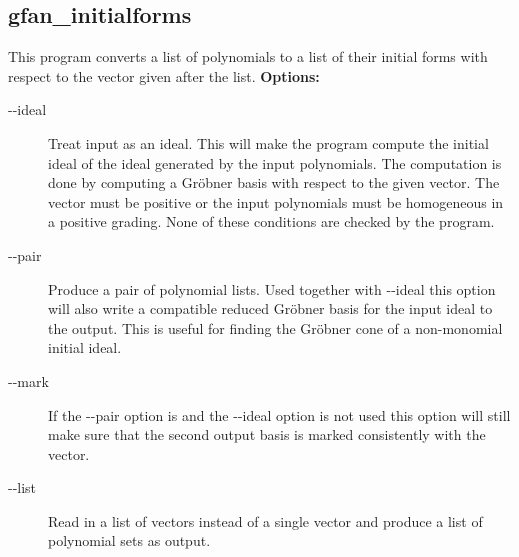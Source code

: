 {{{{{{{{{{{{{{{\subsection{gfan\_initialforms}\label{applist:_initialforms}
This program converts a list of polynomials to a list of their initial forms with respect to the vector given after the list.
\newline
{\bf Options:}
\begin{description}
\item[-\hspace{0.013cm}-ideal]Treat input as an ideal. This will make the program compute the initial ideal of the ideal generated by the input polynomials. The computation is done by computing a Gr\"obner basis with respect to the given vector. The vector must be positive or the input polynomials must be homogeneous in a positive grading. None of these conditions are checked by the program.
\item[-\hspace{0.013cm}-pair]Produce a pair of polynomial lists. Used together with -\hspace{0.013cm}-ideal this option will also write a compatible reduced Gr\"obner basis for the input ideal to the output. This is useful for finding the Gr\"obner cone of a non-monomial initial ideal.
\item[-\hspace{0.013cm}-mark]If the -\hspace{0.013cm}-pair option is and the -\hspace{0.013cm}-ideal option is not used this option will still make sure that the second output basis is marked consistently with the vector.\item[-\hspace{0.013cm}-list]Read in a list of vectors instead of a single vector and produce a list of polynomial sets as output.\end{description}


}}}}}}}}}}}}}}}
